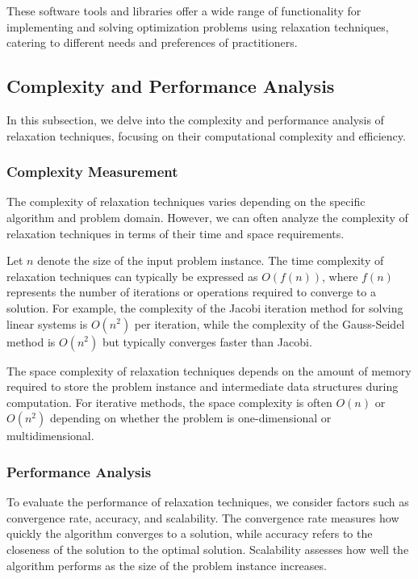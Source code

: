 \documentclass[12pt]{book} %
\begin{document}
These software tools and libraries offer a wide range of functionality for implementing and solving optimization problems using relaxation techniques, catering to different needs and preferences of practitioners.

\subsection{Complexity and Performance Analysis}

In this subsection, we delve into the complexity and performance analysis of relaxation techniques, focusing on their computational complexity and efficiency.

\subsubsection{Complexity Measurement}

The complexity of relaxation techniques varies depending on the specific algorithm and problem domain. However, we can often analyze the complexity of relaxation techniques in terms of their time and space requirements.

Let \(n\) denote the size of the input problem instance. The time complexity of relaxation techniques can typically be expressed as \(O(f(n))\), where \(f(n)\) represents the number of iterations or operations required to converge to a solution. For example, the complexity of the Jacobi iteration method for solving linear systems is \(O(n^2)\) per iteration, while the complexity of the Gauss-Seidel method is \(O(n^2)\) but typically converges faster than Jacobi.

The space complexity of relaxation techniques depends on the amount of memory required to store the problem instance and intermediate data structures during computation. For iterative methods, the space complexity is often \(O(n)\) or \(O(n^2)\) depending on whether the problem is one-dimensional or multidimensional.

\subsubsection{Performance Analysis}

To evaluate the performance of relaxation techniques, we consider factors such as convergence rate, accuracy, and scalability. The convergence rate measures how quickly the algorithm converges to a solution, while accuracy refers to the closeness of the solution to the optimal solution. Scalability assesses how well the algorithm performs as the size of the problem instance increases.
\end{document}
